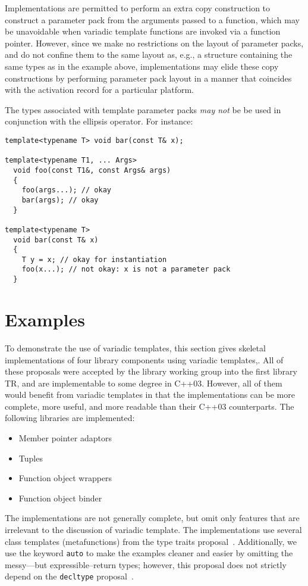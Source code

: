 \documentclass{article}
\begin{document}
Implementations are permitted to perform an extra copy construction to
construct a parameter pack from the arguments passed to a function,
which may be unavoidable when variadic template functions are invoked
via a function pointer. However, since we make no restrictions on the
layout of parameter packs, and do not confine them to the same layout
as, e.g., a structure containing the same types as in the example
above, implementations may elide these copy constructions by
performing parameter pack layout in a manner that coincides with the
activation record for a particular platform.

The types associated with template parameter packs \textit{may not} be
be used in conjunction with the ellipsis operator. For instance:

\begin{verbatim}
template<typename T> void bar(const T& x);

template<typename T1, ... Args>
  void foo(const T1&, const Args& args)
  { 
    foo(args...); // okay
    bar(args); // okay
  }

template<typename T> 
  void bar(const T& x)
  {
    T y = x; // okay for instantiation
    foo(x...); // not okay: x is not a parameter pack
  }
\end{verbatim}

\section{Examples}
To demonstrate the use of variadic templates, this section gives
skeletal implementations of four library components using variadic
templates,. All of these proposals were accepted by the library
working group into the first library TR, and are implementable to some
degree in C++03. However, all of them would benefit from variadic
templates in that the implementations can be more complete, more
useful, and more readable than their C++03 counterparts. The following
libraries are implemented:

\begin{itemize}
\item Member pointer adaptors~\cite{Dimov03a}
\item Tuples~\cite{Jarvi02}
\item Function object wrappers~\cite{Gregor02}
\item Function object binder~\cite{Dimov03b}
\end{itemize}

The implementations are not generally complete, but omit only features
that are irrelevant to the discussion of variadic template. The
implementations use several class templates (metafunctions) from the
type traits proposal~\cite{Maddock03}. Additionally, we use the
keyword {\tt auto} to make the examples cleaner and easier by omitting
the messy---but expressible--return types; however, this proposal does
not strictly depend on the {\tt decltype} proposal~\cite{Jarvi03}.
\end{document}
